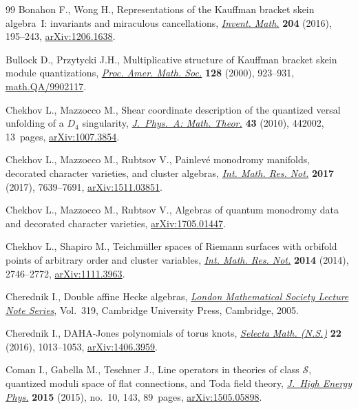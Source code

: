 \documentclass[pdftex]{sigma}
\numberwithin{equation}{section}
\begin{document}
\begin{thebibliography}{99}
Bonahon F., Wong H., Representations of the {K}auffman bracket skein
 algebra~{I}: invariants and miraculous cancellations, \href{https://doi.org/10.1007/s00222-015-0611-y}{\textit{Invent. Math.}}
 \textbf{204} (2016), 195--243, \href{https://arxiv.org/abs/1206.1638}{arXiv:1206.1638}.

Bullock D., Przytycki J.H., Multiplicative structure of {K}auffman bracket
 skein module quantizations, \href{https://doi.org/10.1090/S0002-9939-99-05043-1}{\textit{Proc. Amer. Math. Soc.}} \textbf{128}
 (2000), 923--931, \href{https://arxiv.org/abs/math.QA/9902117}{math.QA/9902117}.

Chekhov L., Mazzocco M., Shear coordinate description of the quantized versal
 unfolding of a {$D_4$} singularity, \href{https://doi.org/10.1088/1751-8113/43/44/442002}{\textit{J.~Phys.~A: Math. Theor.}}
 \textbf{43} (2010), 442002, 13~pages, \href{https://arxiv.org/abs/1007.3854}{arXiv:1007.3854}.

Chekhov L., Mazzocco M., Rubtsov V., Painlev\'{e} monodromy manifolds,
 decorated character varieties, and cluster algebras, \href{https://doi.org/10.1093/imrn/rnw219}{\textit{Int. Math. Res.
 Not.}} \textbf{2017} (2017), 7639--7691, \href{https://arxiv.org/abs/1511.03851}{arXiv:1511.03851}.

Chekhov L., Mazzocco M., Rubtsov V., Algebras of quantum monodromy data and
 decorated character varieties, \href{https://arxiv.org/abs/1705.01447}{arXiv:1705.01447}.

Chekhov L., Shapiro M., Teichm\"{u}ller spaces of {R}iemann surfaces with
 orbifold points of arbitrary order and cluster variables, \href{https://doi.org/10.1093/imrn/rnt016}{\textit{Int. Math.
 Res. Not.}} \textbf{2014} (2014), 2746--2772, \href{https://arxiv.org/abs/1111.3963}{arXiv:1111.3963}.

Cherednik I., Double affine {H}ecke algebras, \href{https://doi.org/10.1017/CBO9780511546501}{\textit{London Mathematical
 Society Lecture Note Series}}, Vol.~319, Cambridge University Press,
 Cambridge, 2005.

Cherednik I., D{AHA}-{J}ones polynomials of torus knots, \href{https://doi.org/10.1007/s00029-015-0210-1}{\textit{Selecta Math.
 (N.S.)}} \textbf{22} (2016), 1013--1053, \href{https://arxiv.org/abs/1406.3959}{arXiv:1406.3959}.

Coman I., Gabella M., Teschner J., Line operators in theories of class
 {$\mathcal S$}, quantized moduli space of flat connections, and {T}oda field
 theory, \href{https://doi.org/10.1007/JHEP10(2015)143}{\textit{J.~High Energy Phys.}} \textbf{2015} (2015), no.~10, 143,
 89~pages, \href{https://arxiv.org/abs/1505.05898}{arXiv:1505.05898}.


\end{thebibliography}
\end{document}
